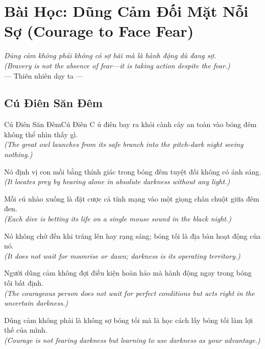 \chapter{Bài Học: Dũng Cảm Đối Mặt Nỗi Sợ (Courage to Face Fear)}
\begin{center}
  \textit{\color{truyenblue}Dũng cảm không phải không có sợ hãi mà là hành động dù đang sợ.}\\
  \textit{(Bravery is not the absence of fear—it is taking action despite the fear.)}\\[4pt]
  \small\color{truyengold}--- Thiên nhiên dạy ta ---
\end{center}
\ngancach

\section{Cú Điên Săn Đêm}
\begin{truyen}{Cú Điên Săn Đêm}{Cú Điên}
C ú điên bay ra khỏi cành cây an toàn vào bóng đêm không thể nhìn thấy gì.\\
\textit{(The great owl launches from its safe branch into the pitch-dark night seeing nothing.)}

Nó định vị con mồi bằng thính giác trong bóng đêm tuyệt đối không có ánh sáng.\\
\textit{(It locates prey by hearing alone in absolute darkness without any light.)}

Mỗi cú nhào xuống là đặt cược cả tính mạng vào một giọng chân chuột giữa đêm đen.\\
\textit{(Each dive is betting its life on a single mouse sound in the black night.)}

Nó không chờ đến khi trăng lên hay rạng sáng; bóng tối là địa bàn hoạt động của nó.\\
\textit{(It does not wait for moonrise or dawn; darkness is its operating territory.)}

Người dũng cảm không đợi điều kiện hoàn hảo mà hành động ngay trong bóng tối bất định.\\
\textit{(The courageous person does not wait for perfect conditions but acts right in the uncertain darkness.)}

\end{truyen}
\begin{baihoc}
  Dũng cảm không phải là không sợ bóng tối mà là học cách lấy bóng tối làm lợi thế của mình.\\
  \textit{(Courage is not fearing darkness but learning to use darkness as your advantage.)}
\end{baihoc}

